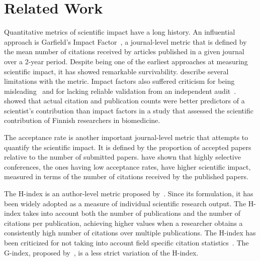 \documentclass[man,floatsintext]{apa6}
\let \citeA \textcite
\let \cite \parencite
\begin{document}
\section{Related Work}\label{sec:related-work}

Quantitative metrics of scientific impact have a long history. An influential approach is
Garfield's Impact Factor~\cite{Garfield1955a}, a journal-level metric that is defined
by the mean number of citations received by articles published in a given journal over a 2-year period. 
Despite being one of the earliest approaches at measuring scientific impact, it has showed remarkable 
survivability. 
\citeA{Pinski1976} describe several limitations with the metric. Impact factors also suffered 
criticism for being misleading~\cite{Nature2016, Saha2003} and for lacking reliable validation from an independent 
audit~\cite{Rossner2007}. \citeA{Riikonen2008} showed that actual citation 
and publication counts were better predictors of a scientist's contribution than impact factors in a 
study that assessed the scientific contribution of Finnish researchers in biomedicine.

The acceptance rate is another important journal-level metric that attempts to quantify the scientific impact. It
is defined by the proportion of accepted papers relative to the number of submitted papers. \citeA{Chen2010} 
have shown that highly selective conferences, the ones having low acceptance rates, have higher 
scientific impact, measured in terms of the number of citations received by the published papers.

The H-index is an author-level metric proposed by~\citeA{Hirsch2005}. Since its formulation, it has been 
widely adopted as a measure of individual scientific research output.
The H-index takes into account both the number of publications and the number of citations per publication, 
achieving higher values when a researcher obtains a consistently high number of citations over multiple publications. 
The H-index has been criticized for not taking into account field specific citation
statistics~\cite{Wendl2007}. The G-index, proposed by~\citeA{Egghe2006}, is a less strict variation 
of the H-index.
\end{document}
